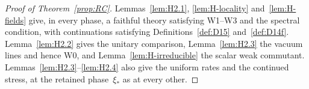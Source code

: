 \begin{proof}[Proof of Theorem~\ref{prop:RC}]
Lemmas~\ref{lem:H2.1}, \ref{lem:H-locality} and~\ref{lem:H-fields} give, in every phase, a faithful theory satisfying W1--W3 and the spectral condition, with continuations satisfying Definitions~\ref{def:D15} and~\ref{def:D14f}. Lemma~\ref{lem:H2.2} gives the unitary comparison, Lemma~\ref{lem:H2.3} the vacuum lines and hence W0, and Lemma~\ref{lem:H-irreducible} the scalar weak commutant. Lemmas~\ref{lem:H2.3}--\ref{lem:H2.4} also give the uniform rates and the continued stress, at the retained phase~$\xi_*$ as at every other.
\end{proof}
